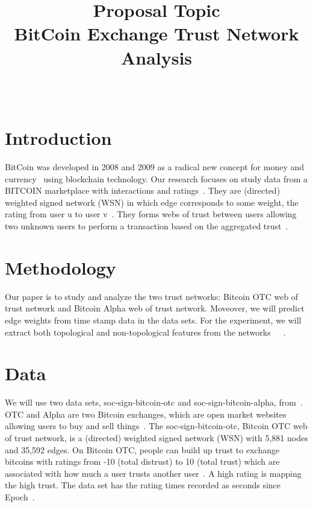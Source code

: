 \documentclass[onecolumn, 12pt]{IEEEtran}
\begin{document}
\title{Proposal Topic \\
BitCoin Exchange Trust Network Analysis
}

\author{\\
}

\maketitle
\section{Introduction}
BitCoin was developed in 2008 and 2009 as a radical new concept for money and currency~\cite{nakamoto2008bitcoin} using blockchain technology.
Our research focuses on study data from a BITCOIN marketplace with interactions and ratings~\cite{aw2018analyzing}.
They are (directed) weighted signed network (WSN) in which edge corresponds to some weight, the rating from user u to user v~\cite{moindrot2017trust}.
They forms webs of trust between users allowing two unknown users to perform a transaction based on the aggregated trust~\cite{moindrot2017trust}.

\section{Methodology}
Our paper is to study and analyze the two trust networks: Bitcoin OTC web of trust network and Bitcoin Alpha web of trust network. Moveover, we will predict edge weights from time stamp data in the data sets.
For the experiment, we will extract both topological and non-topological features from the networks~\cite{liben2007link}~\cite{al2006link}~\cite{davis2011multi}.
\section{Data}
We will use two data sets, soc-sign-bitcoin-otc and soc-sign-bitcoin-alpha, from~\cite{snapnets}.
OTC and Alpha are two Bitcoin exchanges, which are open market websites allowing users to buy and sell things~\cite{snapnets}.
The soc-sign-bitcoin-otc, Bitcoin OTC web of trust network, is a (directed) weighted signed network (WSN) with 5,881 nodes and 35,592 edges.
On Bitcoin OTC, people can build up trust to exchange bitcoins with ratings from -10 (total distrust) to 10 (total trust) which are associated with how much a user trusts another user~\cite{moindrot2017trust}. A high rating is mapping the high trust. The data set has the rating times recorded as seconds since Epoch~\cite{snapnets}.
\end{document}
